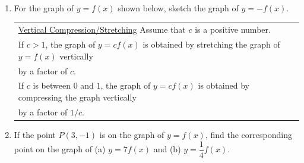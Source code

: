 \documentclass[11pt]{article}
\begin{document}
\begin{enumerate}
\vspace{-.1in}
\item For the graph of $y=f(x)$ shown below, sketch the graph of $y=-f(x)$.\\




\hspace{-.3in} \begin{tabular}{| l |} \hline \underline{Vertical Compression/Stretching} Assume that $c$ is a positive number. \\
If $c>1$, the graph of $y=cf(x)$ is obtained by stretching the graph of $y=f(x)$ vertically \\ by a factor of $c$. \\
If $c$ is between $0$ and $1$, the graph of $y=cf(x)$ is obtained by compressing the graph vertically\\ by a factor of $1/c$.
 \\ \hline
\end{tabular} 


\vspace{-.1in}
\item If the point $P(3,-1)$ is on the graph of $y=f(x)$, find the corresponding point on the graph of (a) $y = 7f(x)$ and (b) $y = \dfrac{1}{4}f(x)$. \\[.4in]




\end{enumerate}
\end{document}
